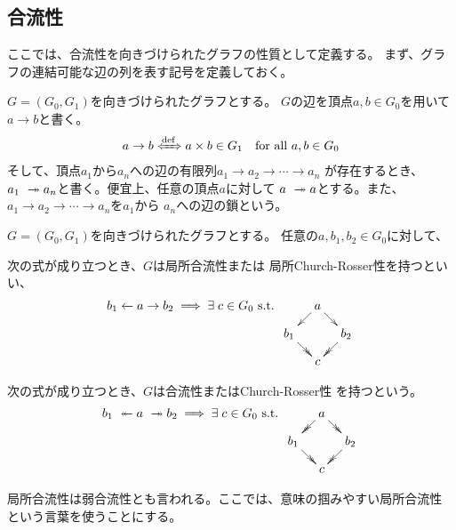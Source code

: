 {\subsection{合流性}\label{s2:合流性} %
	ここでは、合流性を向きづけられたグラフの性質として定義する。
	まず、グラフの連結可能な辺の列を表す記号を定義しておく。

	\begin{definition}[グラフの辺]\label{def:グラフの辺} %
		$G=(G_0,G_1)$を向きづけられたグラフとする。
		$G$の辺を頂点$a,b\in G_0$を用いて$a\to b$と書く。
		\begin{equation*}\begin{split}
			a\to b \xiff{\dfn} a\times b\in G_1 \quad\text{for all } a,b\in G_0
		\end{split}\end{equation*}
		そして、頂点$a_1$から$a_n$への辺の有限列$a_1\to a_2\to\cdots\to a_n$
		が存在するとき、$a_1\xtoto{}a_n$と書く。便宜上、任意の頂点$a$に対して
		$a\xtoto{}a$とする。また、$a_1\to a_2\to\cdots\to a_n$を$a_1$から
		$a_n$への辺の鎖という。
	\end{definition} %

	\begin{definition}\label{def:合流性} %
		$G=(G_0,G_1)$を向きづけられたグラフとする。
		任意の$a,b_1,b_2\in G_0$に対して、
		\begin{description}\setlength{\itemsep}{-1mm} %
			\item[局所合流性] 次の式が成り立つとき、$G$は局所合流性または
			局所Church-Rosser性を持つといい、
			\begin{equation*}\begin{split}
				b_1\from a\to b_2 \implies \exists\; c\in G_0 \text{ s.t. }
				\xymatrix@R=1em@C=1em{
					& a \ar[dl] \ar[dr] \\
					b_1 \ar@{>>}[dr] & & b_2 \ar@{>>}[dl] \\
					& c
				}
			\end{split}\end{equation*}
			\item[合流性] 次の式が成り立つとき、$G$は合流性またはChurch-Rosser性
			を持つという。
			\begin{equation*}\begin{split}
				b_1\xfromfrom{} a\xtoto{} b_2 \implies \exists\; c\in G_0
				\text{ s.t. } \xymatrix@R=1em@C=1em{
					& a \ar@{>>}[dl] \ar@{>>}[dr] \\
					b_1 \ar@{>>}[dr] & & b_2 \ar@{>>}[dl] \\
					& c
				}
			\end{split}\end{equation*}
		\end{description} %
		局所合流性は弱合流性とも言われる。ここでは、意味の掴みやすい局所合流性
		という言葉を使うことにする。
	\end{definition} %

}
